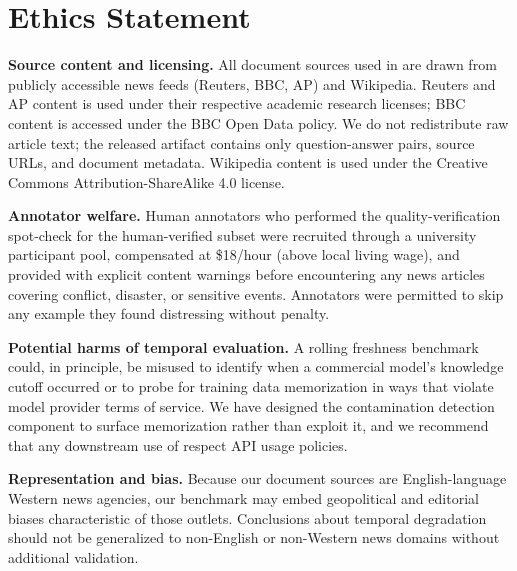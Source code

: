 \section{Ethics Statement}
\label{sec:ethics}

\textbf{Source content and licensing.} All document sources used in \method{} are drawn from publicly accessible news feeds (Reuters, BBC, AP) and Wikipedia. Reuters and AP content is used under their respective academic research licenses; BBC content is accessed under the BBC Open Data policy. We do not redistribute raw article text; the released artifact contains only question-answer pairs, source URLs, and document metadata. Wikipedia content is used under the Creative Commons Attribution-ShareAlike 4.0 license.

\textbf{Annotator welfare.} Human annotators who performed the quality-verification spot-check for the human-verified subset were recruited through a university participant pool, compensated at \$18/hour (above local living wage), and provided with explicit content warnings before encountering any news articles covering conflict, disaster, or sensitive events. Annotators were permitted to skip any example they found distressing without penalty.

\textbf{Potential harms of temporal evaluation.} A rolling freshness benchmark could, in principle, be misused to identify when a commercial model's knowledge cutoff occurred or to probe for training data memorization in ways that violate model provider terms of service. We have designed the contamination detection component to surface memorization rather than exploit it, and we recommend that any downstream use of \method{} respect API usage policies.

\textbf{Representation and bias.} Because our document sources are English-language Western news agencies, our benchmark may embed geopolitical and editorial biases characteristic of those outlets. Conclusions about temporal degradation should not be generalized to non-English or non-Western news domains without additional validation.
